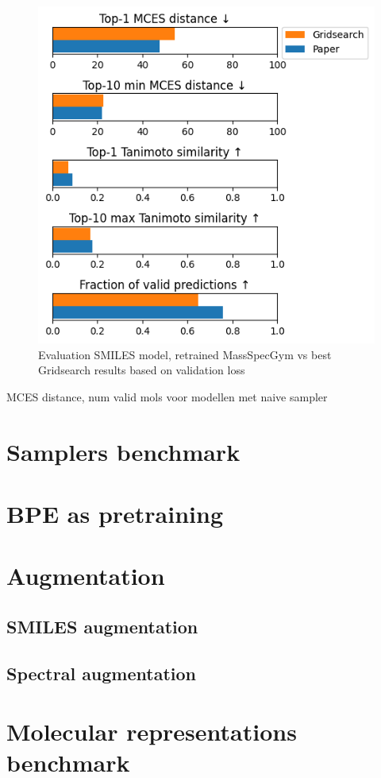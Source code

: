 \begin{figure}[h]
    \centering
    \includegraphics{figures/results/gridsearch_vs_paper.png}
    \caption{Evaluation SMILES model, retrained MassSpecGym vs best Gridsearch results based on validation loss}
    \label{fig:gridsearch_vs_paper}
\end{figure}

MCES distance, num valid mols voor modellen met naive sampler


\section{Samplers benchmark}


\section{\ac{BPE} as pretraining}


\section{Augmentation}

\subsection{SMILES augmentation}

\subsection{Spectral augmentation}


\section{Molecular representations benchmark}